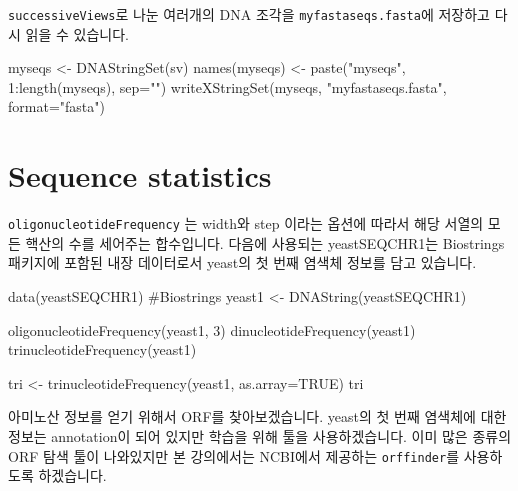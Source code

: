 \documentclass[
  a4paper,
]{book}
\newenvironment{Shaded}{\begin{snugshade}}{\end{snugshade}}
\newcommand{\AttributeTok}[1]{\textcolor[rgb]{0.40,0.45,0.13}{#1}}
\newcommand{\CommentTok}[1]{\textcolor[rgb]{0.37,0.37,0.37}{#1}}
\newcommand{\ConstantTok}[1]{\textcolor[rgb]{0.56,0.35,0.01}{#1}}
\newcommand{\DecValTok}[1]{\textcolor[rgb]{0.68,0.00,0.00}{#1}}
\newcommand{\FunctionTok}[1]{\textcolor[rgb]{0.28,0.35,0.67}{#1}}
\newcommand{\NormalTok}[1]{\textcolor[rgb]{0.00,0.23,0.31}{#1}}
\newcommand{\OtherTok}[1]{\textcolor[rgb]{0.00,0.23,0.31}{#1}}
\newcommand{\SpecialCharTok}[1]{\textcolor[rgb]{0.37,0.37,0.37}{#1}}
\newcommand{\StringTok}[1]{\textcolor[rgb]{0.13,0.47,0.30}{#1}}
\begin{document}
\texttt{successiveViews}로 나눈 여러개의 DNA 조각을
\texttt{myfastaseqs.fasta}에 저장하고 다시 읽을 수 있습니다.

\begin{Shaded}
\begin{Highlighting}[]
\NormalTok{myseqs }\OtherTok{\textless{}{-}} \FunctionTok{DNAStringSet}\NormalTok{(sv)}
\FunctionTok{names}\NormalTok{(myseqs) }\OtherTok{\textless{}{-}} \FunctionTok{paste}\NormalTok{(}\StringTok{"myseqs"}\NormalTok{, }\DecValTok{1}\SpecialCharTok{:}\FunctionTok{length}\NormalTok{(myseqs), }\AttributeTok{sep=}\StringTok{""}\NormalTok{)}
\FunctionTok{writeXStringSet}\NormalTok{(myseqs, }\StringTok{"myfastaseqs.fasta"}\NormalTok{, }\AttributeTok{format=}\StringTok{"fasta"}\NormalTok{)}
\end{Highlighting}
\end{Shaded}

\hypertarget{sequence-statistics}{%
\section{Sequence statistics}\label{sequence-statistics}}

\texttt{oligonucleotideFrequency} 는 width와 step 이라는 옵션에 따라서
해당 서열의 모든 핵산의 수를 세어주는 합수입니다. 다음에 사용되는
yeastSEQCHR1는 Biostrings 패키지에 포함된 내장 데이터로서 yeast의 첫
번째 염색체 정보를 담고 있습니다.

\begin{Shaded}
\begin{Highlighting}[]
\FunctionTok{data}\NormalTok{(yeastSEQCHR1) }\CommentTok{\#Biostrings}
\NormalTok{yeast1 }\OtherTok{\textless{}{-}} \FunctionTok{DNAString}\NormalTok{(yeastSEQCHR1)}

\FunctionTok{oligonucleotideFrequency}\NormalTok{(yeast1, }\DecValTok{3}\NormalTok{)}
\FunctionTok{dinucleotideFrequency}\NormalTok{(yeast1)}
\FunctionTok{trinucleotideFrequency}\NormalTok{(yeast1)}

\NormalTok{tri }\OtherTok{\textless{}{-}} \FunctionTok{trinucleotideFrequency}\NormalTok{(yeast1, }\AttributeTok{as.array=}\ConstantTok{TRUE}\NormalTok{)}
\NormalTok{tri}
\end{Highlighting}
\end{Shaded}

아미노산 정보를 얻기 위해서 ORF를 찾아보겠습니다. yeast의 첫 번째
염색체에 대한 정보는 annotation이 되어 있지만 학습을 위해 툴을
사용하겠습니다. 이미 많은 종류의 ORF 탐색 툴이 나와있지만 본 강의에서는
NCBI에서 제공하는 \texttt{orffinder}를 사용하도록 하겠습니다.
\end{document}
